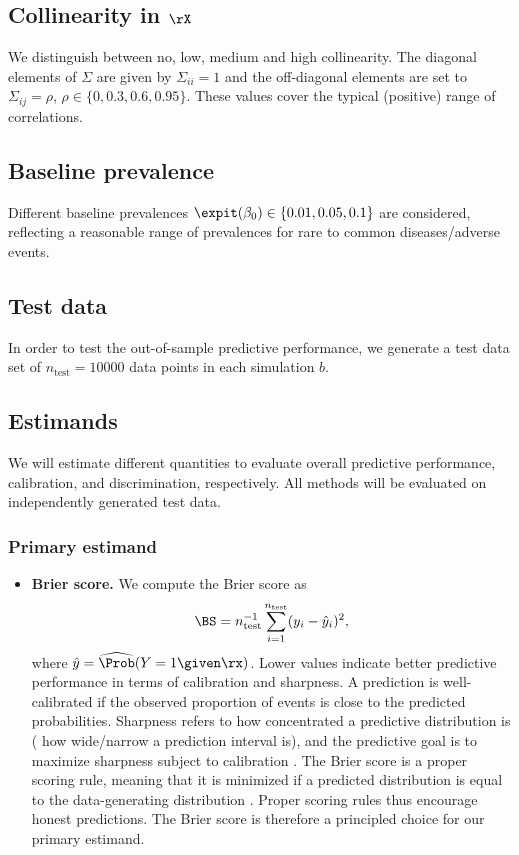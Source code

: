 \begin{subappendices}
\subsection*{Collinearity in $\rX$}
We distinguish between no, low, medium and high collinearity. The diagonal
elements of $\Sigma$ are given by $\Sigma_{ii} = 1$ and the off-diagonal
elements are set to $\Sigma_{ij} = \rho$, $\rho \in \{0, 0.3, 0.6, 0.95\}$.
These values cover the typical (positive) range of correlations.

\subsection*{Baseline prevalence}
Different baseline prevalences $\expit(\beta_0) \in \{0.01, 0.05, 0.1\}$ are
considered, reflecting a reasonable range of prevalences for rare to common
diseases/adverse events.

\subsection*{Test data}
In order to test the out-of-sample predictive performance, we generate a test
data set of \mbox{$n_{\text{test}} = 10000$} data points in each simulation $b$.

\subsection{Estimands} \label{sec6:estimands}

We will estimate different quantities to evaluate overall predictive
performance, calibration, and discrimination, respectively. All methods will be
evaluated on independently generated test data.

\subsubsection{Primary estimand}

\begin{itemize}
  \item \textbf{Brier score.} We compute the Brier score as
  $$\BS = n_{\text{test}}^{-1} \sum_{i=1}^{n_{\text{test}}} (y_{i} - \hat{y}_{i})^2,$$
        where $\hat{y} = \widehat\Prob(Y = 1 \given \rx)$. Lower values indicate
        better predictive performance in terms of calibration and sharpness. A
        prediction is well-calibrated if the observed proportion of events is
        close to the predicted probabilities. Sharpness refers to how
        concentrated a predictive distribution is (\eg{} how wide/narrow a
        prediction interval is), and the predictive goal is to maximize
        sharpness subject to calibration \citep{Gneiting2008}. The Brier score
        is a proper scoring rule, meaning that it is minimized if a predicted
        distribution is equal to the data-generating distribution
        \citep{Gneiting2007}. Proper scoring rules thus encourage honest
        predictions. The Brier score is therefore a principled choice for our
        primary estimand.
\end{itemize}


\end{subappendices}
